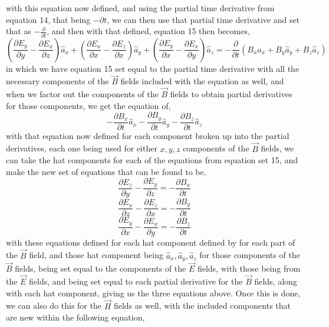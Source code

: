 \documentclass[]{article}
\begin{document}
with this equation now defined, and using the partial time derivative from equation 14, that being $-\partial{t}$, we can then use that partial time derivative and set that as $-\frac{\partial}{\partial{t}}$, and then with that defined, equation 15 then becomes,
\[(\frac{\partial{E}_y}{\partial{y}} - \frac{\partial{E}_x}{\partial{z}})\hat{a}_x + (\frac{\partial{E}_x}{\partial{x}} - \frac{\partial{E}_z}{\partial{x}}) \hat{a}_y + (\frac{\partial{E}_y}{\partial{x}} - \frac{\partial{E}_x}{\partial{y}})\hat{a}_z = -\frac{\partial}{\partial{t}}(B_x\hat{a}_x+B_y\hat{a}_y +B_z\hat{a}_z)\]
in which we have equation 15 set equal to the partial time derivative with all the necessary components of the $\vec{B}$ fields included with the equation as well, and when we factor out the components of the $\vec{B}$ fields to obtain partial derivatives for those components, we get the equation of,
\begin{equation}
-\frac{\partial{B}_x}{\partial{t}}\hat{a}_x - \frac{\partial{B}_y}{\partial{t}}\hat{a}_y - \frac{\partial{B}_z}{\partial{t}}\hat{a}_z
\end{equation}
with that equation now defined for each component broken up into the partial derivatives, each one being used for either $x,y,z$ components of the $\vec{B}$ fields, we can take the hat components for each of the equations from equation set 15, and make the new set of equations that can be found to be,
\begin{equation}
\frac{\partial{E}_z}{\partial{y}} - \frac{\partial{E}_y}{\partial{z}} = -\frac{\partial{B}_x}{\partial{t}}
\end{equation}
\begin{equation}
\frac{\partial{E}_x}{\partial{z}} - \frac{\partial{E}_z}{\partial{x}} = -\frac{\partial{B}_y}{\partial{t}}
\end{equation}
\begin{equation}
\frac{\partial{E}_y}{\partial{x}} - \frac{\partial{E}_x}{\partial{y}} = -\frac{\partial{B}_z}{\partial{t}}
\end{equation}
with these equations defined for each hat component defined by for each part of the $\vec{B}$ field, and those hat component being $\hat{a}_x, \hat{a}_y, \hat{a}_z$ for those components of the $\vec{B}$ fields, being set equal to the components of the $\vec{E}$ fields, with those being from the $\vec{E}$ fields, and being set equal to each partial derivative for the $\vec{B}$ fields, along with each hat component, giving us the three equations above. Once this is done, we can also do this for the $\vec{H}$ fields as well, with the included components that are new within the following equation,
\end{document}
